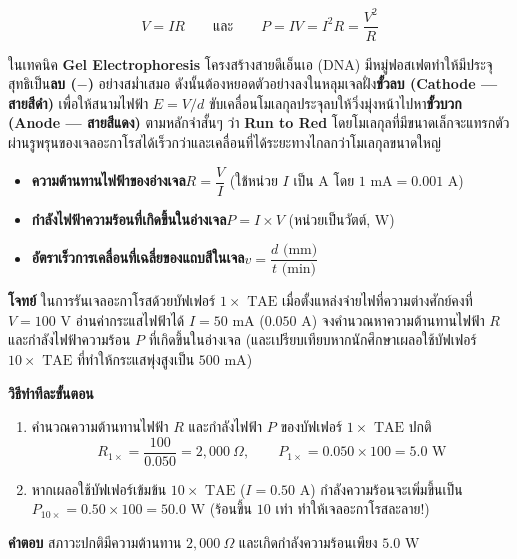 \begin{equation}
    V = I R \qquad \text{และ} \qquad P = I V = I^2 R = \frac{V^2}{R}
    \label{eq:lab08_ohm}
\end{equation}

ในเทคนิค \textbf{Gel Electrophoresis} โครงสร้างสายดีเอ็นเอ (DNA) มีหมู่ฟอสเฟตทำให้มีประจุสุทธิเป็น\textbf{ลบ ($-$)} อย่างสม่ำเสมอ ดังนั้นต้องหยอดตัวอย่างลงในหลุมเจลฝั่ง\textbf{ขั้วลบ (Cathode — สายสีดำ)} เพื่อให้สนามไฟฟ้า $E = V/d$ ขับเคลื่อนโมเลกุลประจุลบให้วิ่งมุ่งหน้าไปหา\textbf{ขั้วบวก (Anode — สายสีแดง)} ตามหลักจำสั้นๆ ว่า \textbf{Run to Red} โดยโมเลกุลที่มีขนาดเล็กจะแทรกตัวผ่านรูพรุนของเจลอะกาโรสได้เร็วกว่าและเคลื่อนที่ได้ระยะทางไกลกว่าโมเลกุลขนาดใหญ่

\begin{conceptbox}
\begin{itemize}
    \item \textbf{ความต้านทานไฟฟ้าของอ่างเจล}\quad $R = \dfrac{V}{I}$ (ใช้หน่วย $I$ เป็น $\text{A}$ โดย $1\text{ mA} = 0.001\text{ A}$)
    \item \textbf{กำลังไฟฟ้าความร้อนที่เกิดขึ้นในอ่างเจล}\quad $P = I \times V$ (หน่วยเป็นวัตต์, $\text{W}$)
    \item \textbf{อัตราเร็วการเคลื่อนที่เฉลี่ยของแถบสีในเจล}\quad $v = \dfrac{d\text{ (mm)}}{t\text{ (min)}}$
\end{itemize}
\end{conceptbox}

\begin{worked}
\textbf{โจทย์} ในการรันเจลอะกาโรสด้วยบัฟเฟอร์ $1\times\text{ TAE}$ เมื่อตั้งแหล่งจ่ายไฟที่ความต่างศักย์คงที่ $V = 100\text{ V}$ อ่านค่ากระแสไฟฟ้าได้ $I = 50\text{ mA}$ ($0.050\text{ A}$) จงคำนวณหาความต้านทานไฟฟ้า $R$ และกำลังไฟฟ้าความร้อน $P$ ที่เกิดขึ้นในอ่างเจล (และเปรียบเทียบหากนักศึกษาเผลอใช้บัฟเฟอร์ $10\times\text{ TAE}$ ที่ทำให้กระแสพุ่งสูงเป็น $500\text{ mA}$)

\textbf{วิธีทำทีละขั้นตอน}
\begin{enumerate}
    \item คำนวณความต้านทานไฟฟ้า $R$ และกำลังไฟฟ้า $P$ ของบัฟเฟอร์ $1\times\text{ TAE}$ ปกติ
    \begin{equation*}
        R_{1\times} = \frac{100}{0.050} = 2{,}000\ \Omega, \qquad P_{1\times} = 0.050 \times 100 = 5.0\text{ W}
    \end{equation*}
    \item หากเผลอใช้บัฟเฟอร์เข้มข้น $10\times\text{ TAE}$ ($I = 0.50\text{ A}$) กำลังความร้อนจะเพิ่มขึ้นเป็น $P_{10\times} = 0.50 \times 100 = 50.0\text{ W}$ (ร้อนขึ้น $10$ เท่า ทำให้เจลอะกาโรสละลาย!)
\end{enumerate}
\textbf{คำตอบ} สภาวะปกติมีความต้านทาน $2{,}000\ \Omega$ และเกิดกำลังความร้อนเพียง $5.0\text{ W}$
\end{worked}

